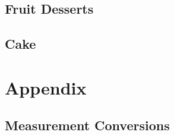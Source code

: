 \documentclass[twoside, openany]{book}
\newcommand{\dish}[1]{}
\begin{document}
\dish{Pie_dough}

\dish{Apple_pie}

\dish{Cherry_pie}

\dish{Rhubarb_pie}

\dish{Blueberry_tart}



\section{Fruit Desserts}

\dish{Baked_apples}

\dish{Berry_crumble}

\dish{Rhubarb_sauce}

\dish{Boiled_apples}

\dish{Lemon_bars}

\dish{Cherry_raspberry_sorbet}

\dish{Berry_jam}


\section{Cake}

\dish{Chocolate_cake}

\dish{Buttercream_frosting}

\dish{Cranberry_cake}

\dish{Raspberry_cheesecake}


\chapter{Appendix}


\section{Measurement Conversions}
\end{document}
